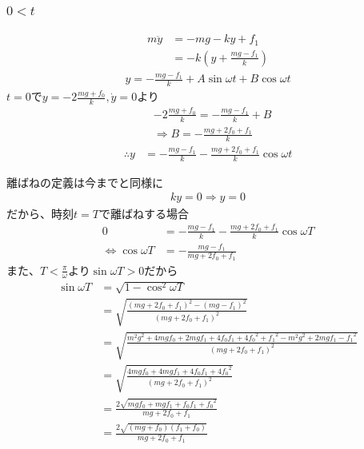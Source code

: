 \documentclass[a4paper,11pt]{jsarticle}
\begin{document}
\subsubsection{$0 < t$}
\begin{align}
  m\ddot{y}
   & = - mg - ky + f_1
  \\
   & = -k\left( y + \frac{mg - f_1}{k} \right)
\end{align}
\begin{align}
  y = - \frac{mg - f_1}{k} + A \sin \omega t + B \cos \omega t
\end{align}
$t=0$で$y=-2\frac{mg + f_0}{k}, \dot{y} = 0$より
\begin{align}
   & -2\frac{mg + f_0}{k} = -\frac{mg - f_1}{k} + B
  \\
   & \Rightarrow
  B = -\frac{mg + 2f_0 + f_1}{k}
\end{align}
\begin{align}
  \therefore y
   & = - \frac{mg - f_1}{k} - \frac{mg + 2f_0 + f_1}{k} \cos \omega t
\end{align}

離ばねの定義は今までと同様に
\begin{align}
  ky=0 \Rightarrow y=0
\end{align}
だから、時刻$t=T$で離ばねする場合
\begin{align}
  0 & = -\frac{mg - f_1}{k} - \frac{mg + 2f_0 + f_1}{k} \cos \omega T
  \\
  \Leftrightarrow
  \cos \omega T
    & = -\frac{mg - f_1}{mg + 2f_0 + f_1}
\end{align}
また、$T<\frac{\pi}{\omega}$より$\sin \omega T > 0$だから
\begin{align}
  \sin \omega T
   & = \sqrt{1 - \cos^2 \omega T}
  \\
   & = \sqrt{ \frac{(mg + 2f_0 + f_1)^2 - (mg - f_1)^2}{(mg + 2f_0 + f_1)^2}}
  \\
   & = \sqrt{
  \frac{m^2g^2 + 4mgf_0 + 2mgf_1 + 4f_0f_1 + 4{f_0}^2 + {f_1}^2 - m^2g^2 + 2mgf_1 - {f_1}^2}
  {(mg + 2f_0 + f_1)^2}
  }
  \\
   & = \sqrt{
    \frac{4mgf_0 + 4mgf_1 + 4f_0f_1 + 4{f_0}^2}{(mg + 2f_0 + f_1)^2}
  }
  \\
   & = \frac{2\sqrt{mgf_0 + mgf_1 + f_0f_1 + {f_0}^2}}{mg + 2f_0 + f_1}
  \\
   & = \frac{2\sqrt{(mg + f_0)(f_1+f_0)}}{mg + 2f_0 + f_1}
\end{align}
\end{document}
